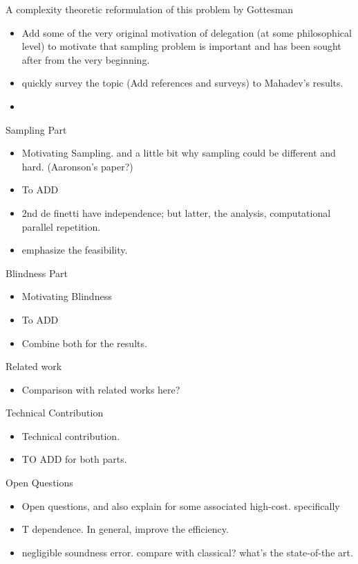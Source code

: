 A complexity theoretic reformulation of this problem by Gottesman~\cite{web:Aaronson}




\begin{itemize}
    \item Add some of the very original motivation of delegation (at some philosophical level) to motivate that sampling problem is important and has been sought after from the very beginning. 
    \item quickly survey the topic (Add references and surveys) to Mahadev's results. 
    \item {}
\end{itemize}

Sampling Part
\begin{itemize}
    \item Motivating Sampling.  and a little bit why sampling could be different and hard. (Aaronson's paper?) 
    \item To ADD
    \item 2nd de finetti have independence; but latter, the analysis, computational parallel repetition. 
    \item emphasize the feasibility. 
\end{itemize}

Blindness Part 
\begin{itemize}
    \item Motivating Blindness
    \item To ADD
    \item Combine both for the results. 
\end{itemize}

Related work
\begin{itemize}
    \item Comparison with related works here?
\end{itemize}

Technical Contribution
\begin{itemize}
    \item Technical contribution. 
    \item TO ADD for both parts. 
\end{itemize}

Open Questions
\begin{itemize}
    \item Open questions, and also explain for some associated high-cost. specifically 
    \item T dependence. In general, improve the efficiency.  
    \item negligible soundness error.  compare with classical? what's the state-of-the art. 
\end{itemize}

